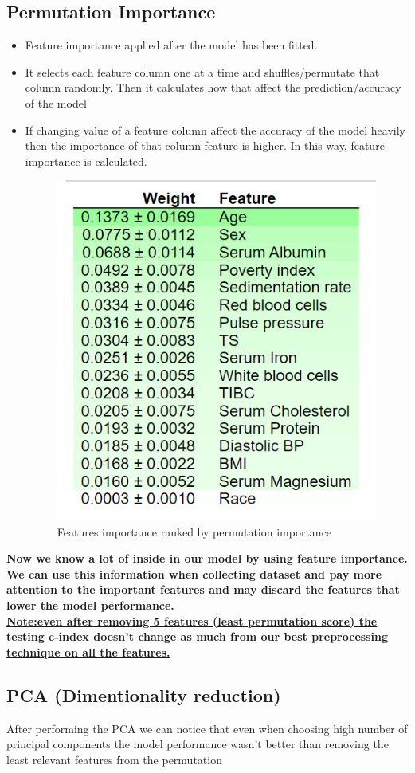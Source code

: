 \documentclass[5 pt]{article}
\begin{document}
\subsection{Permutation Importance}
\begin{itemize}
    \item Feature importance applied after the model has been fitted.
    \item It selects each feature column one at a time and shuffles/permutate that column randomly. Then it calculates how that affect the prediction/accuracy of the model
    \item If changing value of a feature column affect the accuracy of the model heavily then the importance of that column feature is higher. In this way, feature importance is calculated.\\
    
    \begin{figure}[h]
	\centering
	\includegraphics[width=.5\textwidth, height =.28\textheight]{fs.png}
	\caption{Features importance ranked by permutation importance}
	\end{figure}

\end{itemize}

\textbf{Now we know a lot of inside in our model by using feature importance. We can use this information when collecting dataset and pay more attention to the important features and may discard the features that lower the model performance.}\\


\textbf{\underline{Note:even after removing 5 features (least permutation score) the testing c-index doesn't change as much from our best preprocessing technique on all the features.}}


\subsection{PCA (Dimentionality reduction)}
After performing the PCA we can notice that even when choosing high number of principal components the model performance wasn't better than removing  the least relevant features from the permutation\\
\end{document}
